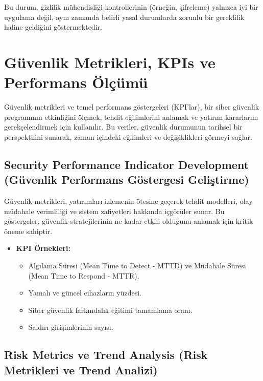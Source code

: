 Bu durum, gizlilik mühendisliği kontrollerinin (örneğin, şifreleme) yalnızca iyi bir uygulama değil, aynı zamanda belirli yasal durumlarda zorunlu bir gereklilik haline geldiğini göstermektedir.

\section{Güvenlik Metrikleri, KPIs ve Performans Ölçümü}

Güvenlik metrikleri ve temel performans göstergeleri (KPI'lar), bir siber güvenlik programının etkinliğini ölçmek, tehdit eğilimlerini anlamak ve yatırım kararlarını gerekçelendirmek için kullanılır. Bu veriler, güvenlik durumunun tarihsel bir perspektifini sunarak, zaman içindeki eğilimleri ve değişiklikleri görmeyi sağlar.

\subsection{Security Performance Indicator Development (Güvenlik Performans Göstergesi Geliştirme)}

Güvenlik metrikleri, yatırımları izlemenin ötesine geçerek tehdit modelleri, olay müdahale verimliliği ve sistem zafiyetleri hakkında içgörüler sunar. Bu göstergeler, güvenlik stratejilerinin ne kadar etkili olduğunu anlamak için kritik öneme sahiptir.
\begin{itemize}
    \item \textbf{KPI Örnekleri:}
    \begin{itemize}
        \item Algılama Süresi (Mean Time to Detect - MTTD) ve Müdahale Süresi (Mean Time to Respond - MTTR).
        \item Yamalı ve güncel cihazların yüzdesi.
        \item Siber güvenlik farkındalık eğitimi tamamlama oranı.
        \item Saldırı girişimlerinin sayısı.
    \end{itemize}
\end{itemize}

\subsection{Risk Metrics ve Trend Analysis (Risk Metrikleri ve Trend Analizi)}

